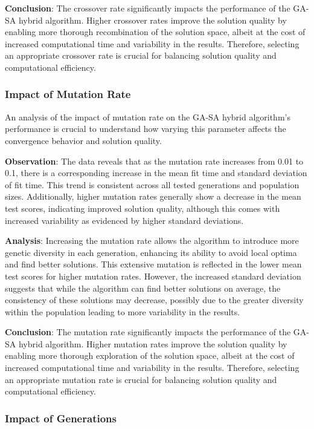 \documentclass{article}
\begin{document}
    \textbf{Conclusion}: The crossover rate significantly impacts the performance of the GA-SA hybrid algorithm. Higher crossover rates improve the solution quality by enabling more thorough recombination of the solution space, albeit at the cost of increased computational time and variability in the results. Therefore, selecting an appropriate crossover rate is crucial for balancing solution quality and computational efficiency.

    \subsubsection{Impact of Mutation Rate}

    An analysis of the impact of mutation rate on the GA-SA hybrid algorithm’s performance is crucial to understand how varying this parameter affects the convergence behavior and solution quality.

    \textbf{Observation}: The data reveals that as the mutation rate increases from 0.01 to 0.1, there is a corresponding increase in the mean fit time and standard deviation of fit time. This trend is consistent across all tested generations and population sizes. Additionally, higher mutation rates generally show a decrease in the mean test scores, indicating improved solution quality, although this comes with increased variability as evidenced by higher standard deviations.

    \textbf{Analysis}: Increasing the mutation rate allows the algorithm to introduce more genetic diversity in each generation, enhancing its ability to avoid local optima and find better solutions. This extensive mutation is reflected in the lower mean test scores for higher mutation rates. However, the increased standard deviation suggests that while the algorithm can find better solutions on average, the consistency of these solutions may decrease, possibly due to the greater diversity within the population leading to more variability in the results.

    \textbf{Conclusion}: The mutation rate significantly impacts the performance of the GA-SA hybrid algorithm. Higher mutation rates improve the solution quality by enabling more thorough exploration of the solution space, albeit at the cost of increased computational time and variability in the results. Therefore, selecting an appropriate mutation rate is crucial for balancing solution quality and computational efficiency.

    \subsubsection{Impact of Generations}
\end{document}
